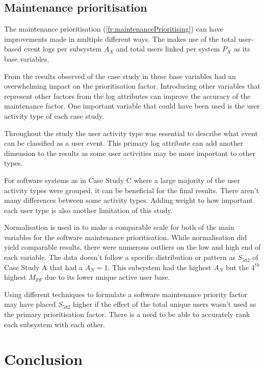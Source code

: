 \subsection{Maintenance prioritisation}
The maintenance prioritisation (\ref{fr:maintenancePrioritising}) can have improvements made in multiple different ways. The  makes use of the total user-based event logs per subsystem $A_X$ and total users linked per system $P_X$ as its base variables.\par From the results observed of the case study in  these base variables had an overwhelming impact on the prioritisation factor. Introducing other variables that represent other factors from the log attributes can improve the accuracy of the maintenance factor. One important variable that could have been used is the user activity type of each case study.\par Throughout the study the user activity type was essential to describe what event can be classified as a user event. This primary log attribute can add another dimension to the results as some user activities may be more important to other types. \par For software systems as in Case Study C where a large majority of the user activity types were grouped, it can be beneficial for the final results. There aren't many differences between some activity types. Adding weight to how important each user type is also another limitation of this study.\par Normalisation is used in  to make a comparable scale for both of the main variables for the software maintenance prioritisation. While normalisation did yield comparable results, there were numerous outliers on the low and high end of each variable. The data doesn't follow a specific distribution or pattern as $S_{582}$ of Case Study A that had a $A_N=1$. This subsystem had the highest $A_N$ but the $4^{th}$ highest $M_{PF}$ due to its lower unique active user base.\par Using different techniques to formulate a software maintenance priority factor may have placed $S_{582}$ higher if the effect of the total unique users wasn't used as the primary prioritisation factor. There is a need to be able to accurately rank each subsystem with each other.

\section{Conclusion}

